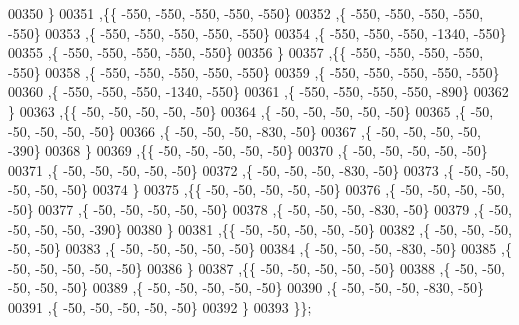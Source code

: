 \begin{DoxyCode}
00350   \}
00351  ,\{\{  -550,  -550,  -550,  -550,  -550\}
00352   ,\{  -550,  -550,  -550,  -550,  -550\}
00353   ,\{  -550,  -550,  -550,  -550,  -550\}
00354   ,\{  -550,  -550,  -550, -1340,  -550\}
00355   ,\{  -550,  -550,  -550,  -550,  -550\}
00356   \}
00357  ,\{\{  -550,  -550,  -550,  -550,  -550\}
00358   ,\{  -550,  -550,  -550,  -550,  -550\}
00359   ,\{  -550,  -550,  -550,  -550,  -550\}
00360   ,\{  -550,  -550,  -550, -1340,  -550\}
00361   ,\{  -550,  -550,  -550,  -550,  -890\}
00362   \}
00363  ,\{\{   -50,   -50,   -50,   -50,   -50\}
00364   ,\{   -50,   -50,   -50,   -50,   -50\}
00365   ,\{   -50,   -50,   -50,   -50,   -50\}
00366   ,\{   -50,   -50,   -50,  -830,   -50\}
00367   ,\{   -50,   -50,   -50,   -50,  -390\}
00368   \}
00369  ,\{\{   -50,   -50,   -50,   -50,   -50\}
00370   ,\{   -50,   -50,   -50,   -50,   -50\}
00371   ,\{   -50,   -50,   -50,   -50,   -50\}
00372   ,\{   -50,   -50,   -50,  -830,   -50\}
00373   ,\{   -50,   -50,   -50,   -50,   -50\}
00374   \}
00375  ,\{\{   -50,   -50,   -50,   -50,   -50\}
00376   ,\{   -50,   -50,   -50,   -50,   -50\}
00377   ,\{   -50,   -50,   -50,   -50,   -50\}
00378   ,\{   -50,   -50,   -50,  -830,   -50\}
00379   ,\{   -50,   -50,   -50,   -50,  -390\}
00380   \}
00381  ,\{\{   -50,   -50,   -50,   -50,   -50\}
00382   ,\{   -50,   -50,   -50,   -50,   -50\}
00383   ,\{   -50,   -50,   -50,   -50,   -50\}
00384   ,\{   -50,   -50,   -50,  -830,   -50\}
00385   ,\{   -50,   -50,   -50,   -50,   -50\}
00386   \}
00387  ,\{\{   -50,   -50,   -50,   -50,   -50\}
00388   ,\{   -50,   -50,   -50,   -50,   -50\}
00389   ,\{   -50,   -50,   -50,   -50,   -50\}
00390   ,\{   -50,   -50,   -50,  -830,   -50\}
00391   ,\{   -50,   -50,   -50,   -50,   -50\}
00392   \}
00393  \}\};
\end{DoxyCode}
